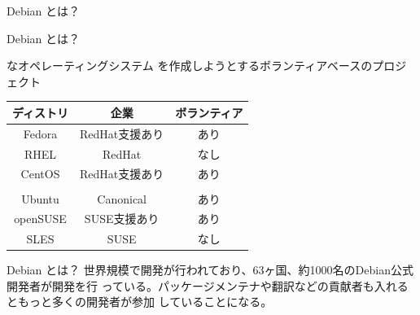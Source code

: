 \begin{frame}\begin{center}\Huge{Debian とは？}\end{center}\end{frame}


\begin{frame}{Debian とは？}

{\color{red}{フリー/オープン}}な{\color{red}{ユニバーサル}}オペレーティングシステム を作成しようとするボランティアベースのプロジェクト

\begin{table}[htb]
  \begin{tabular}{|c|c|c|}
    \hline
    ディストリ & 企業 & ボランティア \\ \hline
    Fedora & RedHat支援あり & あり  \\ \hline
    RHEL & RedHat & なし  \\ \hline
    CentOS & RedHat支援あり & あり \\ \hline
    \color{red}{Debian}  & \color{red}{なし} & \color{red}{あり} \\ \hline
    Ubuntu  & Canonical & あり \\ \hline
    openSUSE & SUSE支援あり & あり \\ \hline
    SLES & SUSE & なし \\ \hline
  \end{tabular}
\end{table}

\end{frame}

\begin{frame}{Debian とは？}
 世界規模で開発が行われており、63ヶ国、約1000名のDebian公式開発者が開発を行
 っている。パッケージメンテナや翻訳などの貢献者も入れるともっと多くの開発者が参加
 していることになる。
 \begin{center}
 \end{center}
\end{frame}


